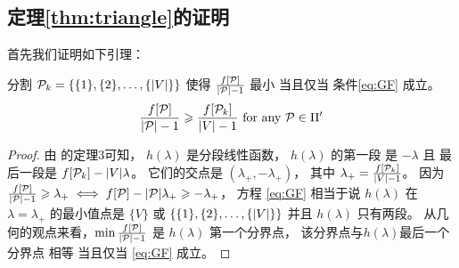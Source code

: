 \subsection{定理\ref{thm:triangle}的证明}
首先我们证明如下引理：
\begin{lemma}\label{thm:trival}
  分割 $\mathcal{P}_k = \{\{1\},\{2\},\dots,\{\lvert V\rvert\}\}$ 
  使得 $\frac{f[\mathcal{P}]}{\lvert\mathcal{P}\rvert-1}$
  最小 当且仅当 条件\eqref{eq:GF} 成立。
  \begin{equation}\label{eq:GF}
  \frac{f[\mathcal{P}]}{\lvert\mathcal{P}\rvert-1} \geqslant \frac{f[\mathcal{P}_k]}{\lvert V\rvert-1} \textrm{ for any } \mathcal{P} \in \Pi'
  \end{equation}
  \end{lemma}
  \begin{proof}
  由\citet{narayanan} 的定理3可知，
  $h(\lambda)$ 是分段线性函数，
  $h(\lambda)$ 的第一段
  是 $ - \lambda $ 且 
  最后一段是 $ f[\mathcal{P}_k] - \lvert V\rvert \lambda$。
  它们的交点是
  $(\lambda_{+}, -\lambda_{+})$，
  其中
  $\lambda_{+} = \frac{f[\mathcal{P}_k]}{\lvert V\rvert-1}$。
  因为 $\frac{f[\mathcal{P}]}{\lvert\mathcal{P}\rvert-1} \geqslant \lambda_{+} \iff f[\mathcal{P}] - \lvert\mathcal{P}\rvert\lambda_{+} \geqslant - \lambda_{+}$，
  方程 \eqref{eq:GF}
  相当于说 $h(\lambda)$ 在 $\lambda = \lambda_{+}$
  的最小值点是
  $\{V\}$ 或
  $\{\{1\},\{2\},\dots,\{\lvert V\rvert\}\}$
  并且 $h(\lambda)$ 只有两段。
  从几何的观点来看，$\min\frac{f[\mathcal{P}]}{\lvert\mathcal{P}\rvert-1}$
  是 $h(\lambda)$ 第一个分界点，
  该分界点与$h(\lambda)$最后一个分界点
  相等 当且仅当 \eqref{eq:GF} 成立。
  \end{proof}
